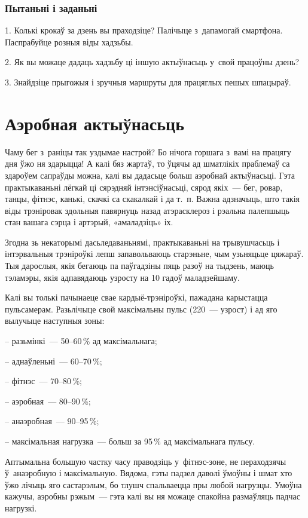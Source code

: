 \subsubsection{Пытаньні і заданьні}

1. Колькі крокаў за дзень вы праходзіце? Палічыце з~дапамогай смартфона. Паспрабуйце розныя віды хадзьбы.

2. Як вы можаце дадаць хадзьбу ці іншую актыўнасьць у~свой працоўны дзень?

3. Знайдзіце прыгожыя і зручныя маршруты для працяглых пешых шпацыраў.


\section{Аэробная актыўнасьць}

Чаму бег з~раніцы так уздымае настрой? Бо нічога горшага з~вамі на працягу дня ўжо ня здарыцца! А калі бяз жартаў, то ўцячы ад шматлікіх праблемаў са здароўем сапраўды можна, калі вы дадасьце больш аэробнай актыўнасьці. Гэта практыкаваньні лёгкай ці сярэдняй інтэнсіўнасьці, сярод якіх~--- бег, ровар, танцы, фітнэс, канькі, скачкі са скакалкай і да т.~п. Важна адзначыць, што такія віды трэніровак здольныя павярнуць назад атэрасклероз і рэальна палепшыць стан вашага сэрца і артэрый, «амаладзіць» іх.

Згодна зь некаторымі дасьледаваньнямі, практыкаваньні на трывушчасьць і інтэрвальныя трэніроўкі лепш запавольваюць старэньне, чым узьняцьце цяжараў. Тыя дарослыя, якія бегаюць па паўгадзіны пяць разоў на тыдзень, маюць тэламэры, якія адпавядаюць узросту на 10 гадоў маладзейшаму.

Калі вы толькі пачынаеце свае кардыё-трэніроўкі, пажадана карыстацца пульсамерам. Разьлічыце свой максімальны пульс (220~--- узрост) і ад яго вылучыце наступныя зоны:

– разьмінкі~--- 50--60\,\% ад максімальнага;

– аднаўленьні~--- 60--70\,\%;

– фітнэс~--- 70--80\,\%;

– аэробная~--- 80--90\,\%;

– анаэробная~--- 90--95\,\%;

– максімальная нагрузка~--- больш за 95\,\% ад максімальнага пульсу.

Аптымальна большую частку часу праводзіць у~фітнэс-зоне, не пераходзячы ў~анаэробную і максімальную. Вядома, гэты падзел даволі ўмоўны і шмат хто ўжо лічыць яго састарэлым, бо тлушч спальваецца пры любой нагрузцы. Умоўна кажучы, аэробны рэжым~--- гэта калі вы ня можаце спакойна размаўляць падчас нагрузкі.

